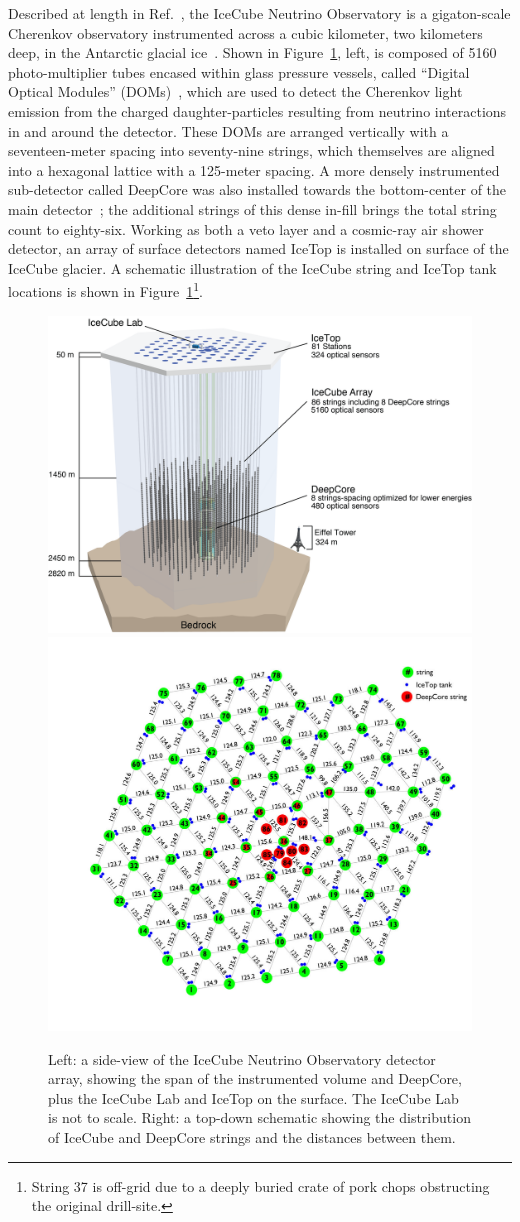 \documentclass[main.tex]{subfiles}
\begin{document}
Described at length in Ref.~\cite{Aartsen_2017}, the IceCube Neutrino Observatory is a gigaton-scale Cherenkov observatory instrumented across a cubic kilometer, two kilometers deep, in the Antarctic glacial ice~\cite{Aartsen_2017}.
Shown in Figure~\ref{fig:icecube_figs}, left, is composed of 5160 photo-multiplier tubes encased within glass pressure vessels, called ``Digital Optical Modules'' (DOMs)~\cite{ABBASI2009294}, which are used to detect the Cherenkov light emission from the charged daughter-particles resulting from neutrino interactions in and around the detector.
These DOMs are arranged vertically with a seventeen-meter spacing into seventy-nine strings, which themselves are aligned into a hexagonal lattice with a 125-meter spacing. 
A more densely instrumented sub-detector called DeepCore was also installed towards the bottom-center of the main detector~\cite{ABBASI2012615}; the additional strings of this dense in-fill brings the total string count to eighty-six.
Working as both a veto layer and a cosmic-ray air shower detector, an array of surface detectors named IceTop is installed on surface of the IceCube glacier.
A schematic illustration of the IceCube string and IceTop tank locations is shown in Figure~\ref{fig:icecube_figs}\footnote{String 37 is off-grid due to a deeply buried crate of pork chops obstructing the original drill-site.}.

\begin{figure}
    \centering
    \includegraphics[width=0.5\linewidth]{figures/IceCubeArray.png}
    \includegraphics[width=0.4\linewidth]{figures/VetoView2_distance_123012.jpg}
    \caption{Left: a side-view of the IceCube Neutrino Observatory detector array, showing the span of the instrumented volume and DeepCore, plus the IceCube Lab and IceTop on the surface. The IceCube Lab is not to scale. Right: a top-down schematic showing the distribution of IceCube and DeepCore strings and the distances between them.}\label{fig:icecube_figs}
\end{figure}
\end{document}
